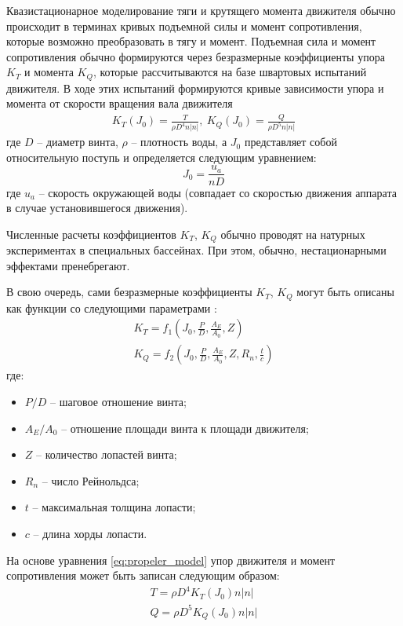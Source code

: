 Квазистационарное моделирование тяги и крутящего момента движителя обычно происходит в терминах кривых подъемной силы и момент сопротивления, которые возможно преобразовать в тягу и момент.
Подъемная сила и момент сопротивления обычно формируются через безразмерные коэффициенты упора $K_T$ и момента $K_Q$, которые рассчитываются на базе швартовых испытаний движителя.
В ходе этих испытаний формируются кривые зависимости упора и момента от скорости вращения вала движителя
\begin{gather}
\label{eq:propeler_model}
    K_T (J_0) = \frac{T}{\rho D^4 n |n|}, \:
    K_Q (J_0) = \frac{Q}{\rho D^5 n |n|}
\end{gather}
\noindent где $D$ -- диаметр винта, $\rho$ -- плотность воды, а $J_0$ представляет собой относительную поступь и определяется следующим уравнением:
\begin{equation}
    J_0 = \frac{u_a}{nD}
\end{equation}
\noindent где $u_a$ -- скорость окружающей воды (совпадает со скоростью движения аппарата в случае установившегося движения).

Численные расчеты коэффициентов $K_T$, $K_Q$ обычно проводят на натурных экспериментах в специальных бассейнах.
При этом, обычно, нестационарными эффектами пренебрегают.

В свою очередь, сами безразмерные коэффициенты $K_T$, $K_Q$ могут быть описаны как функции со следующими параметрами \cite{oosterveld1975further}:
\begin{gather}
    K_T = f_1 \left( J_0, \frac{P}{D}, \frac{A_E}{A_0}, Z \right) \\
    K_Q = f_2 \left( J_0, \frac{P}{D}, \frac{A_E}{A_0}, Z, R_n, \frac{t}{c} \right) 
\end{gather}
\noindent где:
\begin{itemize}
    \item $P/D$ -- шаговое отношение винта;
    \item $A_E/A_0$ -- отношение площади винта к площади движителя;
    \item $Z$ -- количество лопастей винта;
    \item $R_n$ -- число Рейнольдса;
    \item $t$ -- максимальная толщина лопасти;
    \item $c$ -- длина хорды лопасти.
\end{itemize}

На основе уравнения \ref{eq:propeler_model} упор движителя и момент сопротивления может быть записан следующим образом:
\begin{gather}
    T = \rho D^4K_T(J_0)n|n| \\
    Q = \rho D^5K_Q(J_0)n|n|
\end{gather}

